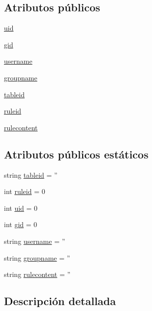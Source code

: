 \subsection*{Atributos públicos}
\begin{DoxyCompactItemize}
\item 
\hyperlink{classdb__layer_1_1_rule_a99584e0f74f7c52fb08bd7df132672ad}{uid}
\item 
\hyperlink{classdb__layer_1_1_rule_a91b3762b7d9fff303d381673fa4d2b7e}{gid}
\item 
\hyperlink{classdb__layer_1_1_rule_adb9fcf60a52edeada35d9074b1533080}{username}
\item 
\hyperlink{classdb__layer_1_1_rule_a55660655f1b48f3f9f6c564781e7146b}{groupname}
\item 
\hyperlink{classdb__layer_1_1_rule_a27231c3bdb91a5ca5182fd3d82b450f2}{tableid}
\item 
\hyperlink{classdb__layer_1_1_rule_af82864d81aca316dcd34545f42598160}{ruleid}
\item 
\hyperlink{classdb__layer_1_1_rule_a818bda1ddeae841530511302a3a4d12b}{rulecontent}
\end{DoxyCompactItemize}
\subsection*{Atributos públicos estáticos}
\begin{DoxyCompactItemize}
\item 
string \hyperlink{classdb__layer_1_1_rule_a95e5ea7102732d56c61b4a0b3f37619b}{tableid} = ''
\item 
int \hyperlink{classdb__layer_1_1_rule_a9826ed75d79061c3fe046e62864ffa58}{ruleid} = 0
\item 
int \hyperlink{classdb__layer_1_1_rule_acd0964c11f2797d211f109a379bfd595}{uid} = 0
\item 
int \hyperlink{classdb__layer_1_1_rule_acc2d1385294c5f2e6c904d5d45f6b993}{gid} = 0
\item 
string \hyperlink{classdb__layer_1_1_rule_a3b04471d06abe2199c7f9deb646be68d}{username} = ''
\item 
string \hyperlink{classdb__layer_1_1_rule_a34a1b2f08b6ff459e4a4ab84ddf6732e}{groupname} = ''
\item 
string \hyperlink{classdb__layer_1_1_rule_adda2b017e49fb9e1ce8a18821062e94d}{rulecontent} = ''
\end{DoxyCompactItemize}


\subsection{Descripción detallada}


